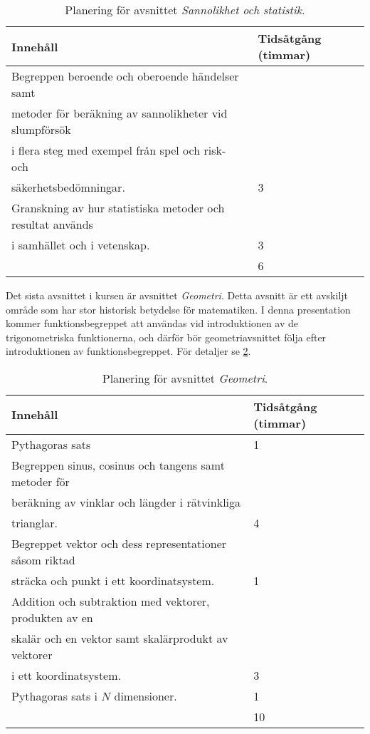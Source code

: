 \begin{table}
  \caption{%
    Planering för avsnittet \emph{Sannolikhet och statistik}.
  }\label{tbl:sannolikhet}
  \begin{tabular}{ll}
    Innehåll & Tidsåtgång (timmar) \\
    \toprule
    Begreppen beroende och oberoende händelser samt\\
      metoder för beräkning av sannolikheter vid slumpförsök\\
      i flera steg med exempel från spel och risk- och\\
      säkerhetsbedömningar. & 3 \\
    \midrule
    Granskning av hur statistiska metoder och resultat används\\
      i samhället och i vetenskap. & 3 \\
    \bottomrule
    & 6 \\
  \end{tabular}
\end{table}

Det sista avsnittet i kursen är avsnittet \emph{Geometri}.
Detta avsnitt är ett avskiljt område som har stor historisk betydelse för
matematiken.
I denna presentation kommer funktionsbegreppet att användas vid introduktionen
av de trigonometriska funktionerna, och därför bör geometriavsnittet följa
efter introduktionen av funktionsbegreppet.
För detaljer se \cref{tbl:geometri}.

\begin{table}
  \caption{%
    Planering för avsnittet \emph{Geometri}.
  }\label{tbl:geometri}
  \begin{tabular}{ll}
    Innehåll & Tidsåtgång (timmar) \\
    \toprule
    Pythagoras sats & 1 \\
    \midrule
    Begreppen sinus, cosinus och tangens samt metoder för\\
      beräkning av vinklar och längder i rätvinkliga\\
      trianglar. & 4 \\
    \midrule
    Begreppet vektor och dess representationer såsom riktad\\
      sträcka och punkt i ett koordinatsystem. & 1 \\
    \midrule
    Addition och subtraktion med vektorer, produkten av en\\
      skalär och en vektor samt skalärprodukt av vektorer\\
      i ett koordinatsystem. & 3 \\
    \midrule
    Pythagoras sats i \(N\) dimensioner. & 1 \\
    \bottomrule
    & 10 \\
  \end{tabular}
\end{table}

